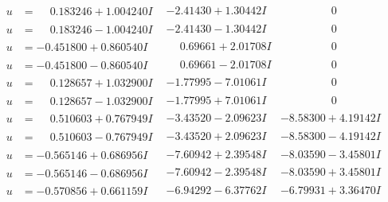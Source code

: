 \documentclass[1p]{elsarticle_modified}
\theoremstyle{definition}
\begin{document}
$$\begin{array}{c|c|c}
\begin{aligned}
u &= \phantom{-}0.183246 + 1.004240 I\end{aligned}
 & -2.41430 + 1.30442 I & \phantom{-0.000000 } 0 \\ \hline\begin{aligned}
u &= \phantom{-}0.183246 - 1.004240 I\end{aligned}
 & -2.41430 - 1.30442 I & \phantom{-0.000000 } 0 \\ \hline\begin{aligned}
u &= -0.451800 + 0.860540 I\end{aligned}
 & \phantom{-}0.69661 + 2.01708 I & \phantom{-0.000000 } 0 \\ \hline\begin{aligned}
u &= -0.451800 - 0.860540 I\end{aligned}
 & \phantom{-}0.69661 - 2.01708 I & \phantom{-0.000000 } 0 \\ \hline\begin{aligned}
u &= \phantom{-}0.128657 + 1.032900 I\end{aligned}
 & -1.77995 - 7.01061 I & \phantom{-0.000000 } 0 \\ \hline\begin{aligned}
u &= \phantom{-}0.128657 - 1.032900 I\end{aligned}
 & -1.77995 + 7.01061 I & \phantom{-0.000000 } 0 \\ \hline\begin{aligned}
u &= \phantom{-}0.510603 + 0.767949 I\end{aligned}
 & -3.43520 - 2.09623 I & -8.58300 + 4.19142 I \\ \hline\begin{aligned}
u &= \phantom{-}0.510603 - 0.767949 I\end{aligned}
 & -3.43520 + 2.09623 I & -8.58300 - 4.19142 I \\ \hline\begin{aligned}
u &= -0.565146 + 0.686956 I\end{aligned}
 & -7.60942 + 2.39548 I & -8.03590 - 3.45801 I \\ \hline\begin{aligned}
u &= -0.565146 - 0.686956 I\end{aligned}
 & -7.60942 - 2.39548 I & -8.03590 + 3.45801 I \\ \hline\begin{aligned}
u &= -0.570856 + 0.661159 I\end{aligned}
 & -6.94292 - 6.37762 I & -6.79931 + 3.36470 I \\ \hline\begin{aligned}

\end{aligned}
\end{array}$$
\end{document}
